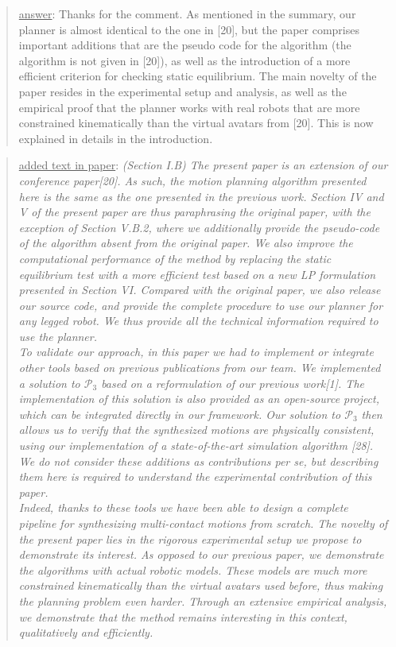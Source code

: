 \documentclass[a4paper]{article}
\newcommand{\done}[0]{}
\newcommand\as[1]{\begin{quote} \underline{answer}: {#1}\end{quote} }
\newcommand\qt[1]{\begin{quote} \underline{added text in paper}: \textit{#1}\end{quote} \leavevmode \\ }
\begin{document}
\as{Thanks for the comment. As mentioned in the summary, our planner is almost identical to the one in [20], but the paper comprises important additions that are the pseudo code for the algorithm (the algorithm is not given in [20]), as well as the introduction of a more efficient criterion
for checking static equilibrium.  The main novelty of the paper resides in the experimental setup and analysis, as well as the empirical proof that the planner works with real robots that are more constrained kinematically than the virtual avatars from [20]. This is now explained in details in the introduction.}
\qt{(Section I.B) The present paper is an extension of our conference paper[20]. As such, the motion planning algorithm presented here is the same as the one presented in the
previous work. Section IV and V of the present paper are thus paraphrasing the original paper, with the exception of Section V.B.2, where we additionally provide the pseudo-code of the algorithm absent from the original paper. We also improve the computational performance of the method by replacing the static equilibrium test with a more efficient test based on a new LP formulation presented in Section VI.
Compared with the original paper, we also release our source code, and provide the complete procedure to use our planner for any legged robot. We thus provide
all the technical information required to use the planner.\\
To validate our approach, in this paper we had to implement or integrate other tools based on previous publications from our team. We implemented a solution to $\mathcal{P}_3$ based on a reformulation of our previous work[1]. The implementation of this solution is also provided as an open-source project, which can be integrated directly in our framework. Our solution to $\mathcal{P}_3$ then allows us to verify that the synthesized motions are physically consistent, using our implementation of a state-of-the-art simulation algorithm [28].
We do not consider these additions as contributions per se, but describing them here is required to understand the experimental contribution of this paper.\\
Indeed, thanks to these tools we have been able to design a complete pipeline for synthesizing multi-contact motions from scratch.
The novelty of the present paper lies in the rigorous experimental setup we propose to demonstrate its interest.
As opposed to our previous paper, we demonstrate the algorithms with actual robotic models. These models are much more constrained kinematically than the virtual avatars used before,
thus making the planning problem even harder. Through an extensive empirical analysis, we demonstrate that the method remains interesting in this context, qualitatively and efficiently.}
\done
\end{document}
